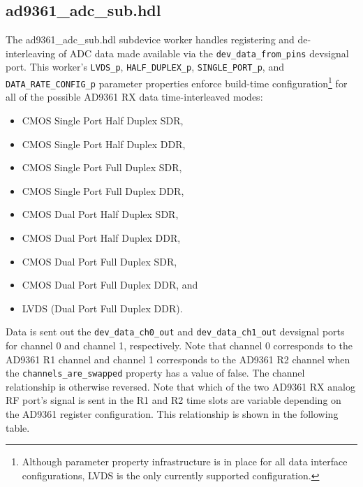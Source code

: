 \documentclass{article}
\def\comp{ad9361\_adc\_sub}
\begin{document}
\subsection*{\comp.hdl}
\begin{sloppypar}
The \comp.hdl subdevice worker handles registering and de-interleaving of ADC data made available via the \verb+dev_data_from_pins+ devsignal port. This worker's \verb+LVDS_p+, \verb+HALF_DUPLEX_p+, \verb+SINGLE_PORT_p+, and \verb+DATA_RATE_CONFIG_p+ parameter properties enforce build-time configuration\footnote{Although parameter property infrastructure is in place for all data interface configurations, LVDS is the only currently supported configuration.} for all of the possible AD9361 RX data time-interleaved modes:
\begin{itemize}
	\item CMOS Single Port Half Duplex SDR,
	\item CMOS Single Port Half Duplex DDR,
	\item CMOS Single Port Full Duplex SDR,
	\item CMOS Single Port Full Duplex DDR,
	\item CMOS Dual Port Half Duplex SDR,
	\item CMOS Dual Port Half Duplex DDR,
	\item CMOS Dual Port Full Duplex SDR,
	\item CMOS Dual Port Full Duplex DDR, and
	\item LVDS (Dual Port Full Duplex DDR).
\end{itemize}
Data is sent out the \verb+dev_data_ch0_out+ and \verb+dev_data_ch1_out+ devsignal ports for channel 0 and channel 1, respectively. Note that channel 0 corresponds to the AD9361 R1 channel and channel 1 corresponds to the AD9361 R2 channel when the \verb+channels_are_swapped+ property has a value of false. The channel relationship is otherwise reversed. Note that which of the two AD9361 RX analog RF port's signal is sent in the R1 and R2 time slots are variable depending on the AD9361 register configuration. This relationship is shown in the following table.
\end{sloppypar}
\end{document}
